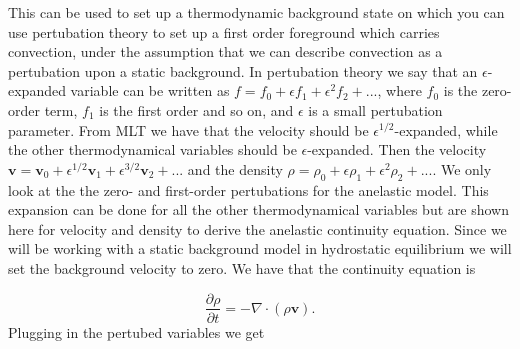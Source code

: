 This can be used to set up a thermodynamic background state on which you can use pertubation theory to set up a first order foreground which carries convection, under the assumption that we can describe convection as a pertubation upon a static background. In pertubation theory we say that an $\epsilon$-expanded variable can be written as $f=f_0+\epsilon f_1+\epsilon^2 f_2+...$, where $f_0$ is the zero-order term, $f_1$ is the first order and so on, and $\epsilon$ is a small pertubation parameter. From MLT we have that the velocity should be $\epsilon^{1/2}$-expanded, while the other thermodynamical variables should be $\epsilon$-expanded. Then the velocity $\mathbf{v}=\mathbf{v}_0 + \epsilon^{1/2}\mathbf{v}_1+\epsilon^{3/2}\mathbf{v}_2+...$ and the density $\rho=\rho_0+\epsilon\rho_1+\epsilon^2\rho_2+...$. We only look at the the zero- and first-order pertubations for the anelastic model. This expansion can be done for all the other thermodynamical variables but are shown here for velocity and density to derive the anelastic continuity equation. Since we will be working with a static background model in hydrostatic equilibrium we will set the background velocity to zero. We have that the continuity equation is 

\begin{equation}
    \frac{\partial\rho}{\partial t} = -\nabla\cdot (\rho\mathbf{v}).
\end{equation}
Plugging in the pertubed variables we get


